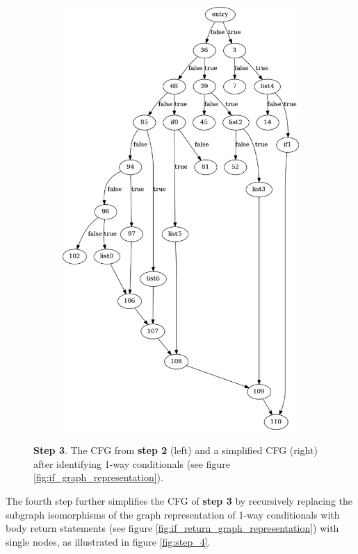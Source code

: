 \begin{figure}[htbp]
\begin{subfigure}[t]{0.45\textwidth}
		\includegraphics[width=\textwidth]{appendices/stmt_example/stmt_3.png}
	\end{subfigure}
	\caption{\textbf{Step 3}. The CFG from \textbf{step 2} (left) and a simplified CFG (right) after identifying 1-way conditionals (see figure \ref{fig:if_graph_representation}).}
	\label{fig:step_3}
\end{figure}

The fourth step further simplifies the CFG of \textbf{step 3} by recursively replacing the subgraph isomorphisms of the graph representation of 1-way conditionals with body return statements (see figure \ref{fig:if_return_graph_representation}) with single nodes, as illustrated in figure \ref{fig:step_4}.

